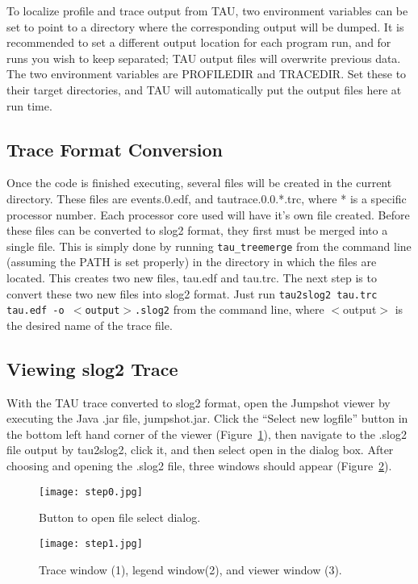 \documentclass[11pt,letterpaper]{article}
\begin{document}
To localize profile and trace output from TAU, two environment variables can be set to point to a directory where the corresponding output will be dumped. It is recommended to set a different output location for each program run, and for runs you wish to keep separated; TAU output files will overwrite previous data. The two environment variables are \mbox{PROFILEDIR} and \mbox{TRACEDIR}. Set these to their target directories, and TAU will automatically put the output files here at run time.

\subsection{Trace Format Conversion}
Once the code is finished executing, several files will be created in the current directory. These files are events.0.edf, and tautrace.0.0.*.trc, where * is a specific processor number. Each processor core used will have it's own file created. Before these files can be converted to slog2 format, they first must be merged into a single file. This is simply done by running {\tt tau\_treemerge} from the command line (assuming the PATH is set properly) in the directory in which the files are located. This creates two new  files, tau.edf and tau.trc.
The next step is to convert these two new files into slog2 format. Just run {\tt tau2slog2 tau.trc tau.edf -o $<$output$>$.slog2} from the command line, where $<$output$>$ is the desired name of the trace file.

\subsection{Viewing slog2 Trace}
With the TAU trace converted to slog2 format, open the Jumpshot viewer by executing the Java .jar file, jumpshot.jar. Click the ``Select new logfile'' button in the bottom left hand corner of the viewer (Figure~\ref{fig:select_button}), then navigate to the .slog2 file output by tau2slog2, click it, and then select open in the dialog box. After choosing and opening the .slog2 file, three windows should appear
(Figure~\ref{fig:three_windows}).

\begin{figure}
\centering
\texttt{[image: step0.jpg]}
\caption{Button to open file select dialog.}
\label{fig:select_button}
\end{figure}

\begin{figure}
\centering
\texttt{[image: step1.jpg]}
\caption{Trace window (1), legend window(2), and viewer window (3).}
\label{fig:three_windows}
\end{figure}
\end{document}
